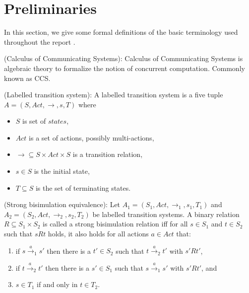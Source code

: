 \section{Preliminaries}
\label{sec:preliminaries}

In this section, we give some formal definitions of the basic terminology used throughout the report \cite{ReactiveSystems}\cite{ModellingAndAnalysis}.

\begin{definition}
(Calculus of Communicating Systems): Calculus of Communicating Systems is algebraic theory to formalize the notion of concurrent computation. Commonly known as CCS.
\end{definition}

\begin{definition}
(Labelled transition system): A labelled transition system is a five tuple $A=\left(S, Act, \rightarrow, s, T \right)$ where
\begin{itemize}
	\item $S$ is set of $states$,
	\item $Act$ is a set of actions, possibly multi-actions,
	\item $\rightarrow \subseteq S \times Act \times S$ is a transition relation,
	\item $s \in S$ is the initial state,
	\item $T \subseteq S$ is the set of terminating states.	
\end{itemize}
\end{definition}

\begin{definition}
(Strong bisimulation equivalence): Let $A_{1}=\left(S_{1}, Act, \rightarrow_{1}, s_{1}, T_{1}\right)$ and $A_{2}=\left(S_{2}, Act, \rightarrow_{2}, s_{2}, T_{2}\right)$ be labelled transition systems. A binary relation $R \subseteq S_{1} \times S_{2}$ is called a strong bisimulation relation iff for all $s \in S_{1}$ and $t \in S_{2}$ such that $sRt$ holds, it also holds for all actions $a \in Act$ that:
\begin{enumerate}
\item if $s\stackrel{a}{\rightarrow}_{1}s'$ then there is a $t' \in S_{2}$ such that $t\stackrel{a}{\rightarrow}_{2}t'$ with $s'Rt'$,
\item if $t\stackrel{a}{\rightarrow}_{2}t'$ then there is a $s' \in S_{1}$ such that $s\stackrel{a}{\rightarrow}_{1}s'$ with $s'Rt'$, and
\item $s \in T_{1}$ if and only in $t \in T_{2}$.
\end{enumerate}
\end{definition}

